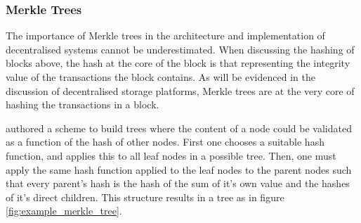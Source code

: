 \subsubsection{Merkle Trees}

The importance of Merkle trees in the architecture and implementation of decentralised systems cannot be underestimated. When discussing the hashing of blocks above, the hash at the core of the block is that representing the integrity value of the transactions the block contains. As will be evidenced in the discussion of decentralised storage platforms, Merkle trees are at the very core of hashing the transactions in a block.

\cite{merkle:1988:inbook} authored a scheme to build trees where the content of a node could be validated as a function of the hash of other nodes. First one chooses a suitable hash function, and applies this to all leaf nodes in a possible tree. Then, one must apply the same hash function applied to the leaf nodes to the parent nodes such that every parent's hash is the hash of the sum of it's own value and the hashes of it's direct children. This structure results in a tree as in figure \ref{fig:example_merkle_tree}.


